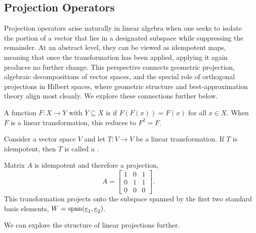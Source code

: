 \subsection{Projection Operators}

Projection operators arise naturally in linear algebra when one seeks to isolate the portion of a vector that lies in a designated subspace while suppressing the remainder.
At an abstract level, they can be viewed as idempotent maps, meaning that once the transformation has been applied, applying it again produces no further change.
This perspective connects geometric projection, algebraic decompositions of vector spaces, and the special role of orthogonal projections in Hilbert spaces, where geometric structure and best-approximation theory align most cleanly.
We explore these connections further below.
	
\begin{definition}
A function $F \colon X \rightarrow Y$ with $Y \subseteq X$ is  if $F(F(x))=F(x)$ for all $x \in X$.
 When $F$ is a linear transformation, this reduces to $F^2 = F$.
\end{definition}

\begin{definition}
Consider a vector space $V$ and let $T \colon V \rightarrow V$ be a linear transformation.
If $T$ is idempotent, then $T$ is called a .
\end{definition}

\begin{example}
Matrix $A$ is idempotent and therefore a projection,
\begin{equation*}
A = \begin{bmatrix}
1 & 0 & 1 \\
0 & 1 & 1 \\
0 & 0 & 0
\end{bmatrix} .
\end{equation*}
This transformation projects onto the subspace spanned by the first two standard basis elements, $W = \mathrm{span} (\underline{e}_1, \underline{e}_2)$.
\end{example}

We can explore the structure of linear projections further.

